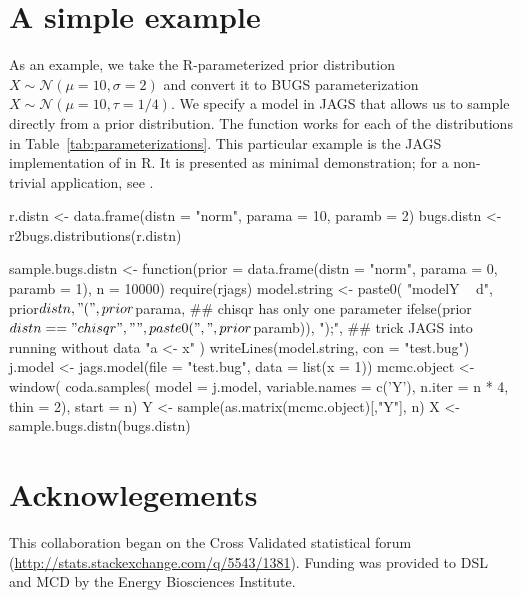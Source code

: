 \section{A simple example}

As an example, we take the R-parameterized prior distribution $X \sim \mathcal{N}(\mu=10,\sigma=2)$ and 
convert it to BUGS  parameterization $X \sim \mathcal{N}(\mu=10,\tau=1/4)$.
We specify a model in JAGS that allows us to sample directly from a prior distribution.  
The function works for each of the distributions in Table~\ref{tab:parameterizations}. 
This particular example is the JAGS implementation of  in R. 
It is presented as minimal demonstration;
for a non-trivial application, see \cite{lebauer2012ffb}. 

\begin{example}

r.distn <- data.frame(distn = "norm", parama = 10, paramb = 2)
bugs.distn <- r2bugs.distributions(r.distn)
   
sample.bugs.distn <- function(prior = data.frame(distn = "norm", parama = 0, 
                                paramb = 1), n = 10000) {
  require(rjags)
  model.string <- paste0(
    "model{Y ~ d", prior$distn, 
    "(", prior$parama, 
    ## chisqr has only one parameter
    ifelse(prior$distn == "chisqr", "", paste0(", ", prior$paramb)), ");",
    ## trick JAGS into running without data 
    "a <- x}"   
  )    
  writeLines(model.string, con = "test.bug")
  j.model  <- jags.model(file = "test.bug", data = list(x = 1))
  mcmc.object <- window(
    coda.samples(
      model = j.model, variable.names = c('Y'), 
      n.iter = n * 4, thin = 2),
    start = n)
  Y <- sample(as.matrix(mcmc.object)[,"Y"], n)
}
X <- sample.bugs.distn(bugs.distn)
\end{example}

\section{Acknowlegements}

This collaboration began on the Cross Validated statistical forum (\url{http://stats.stackexchange.com/q/5543/1381}). Funding was provided to DSL and MCD by the Energy Biosciences Institute.



